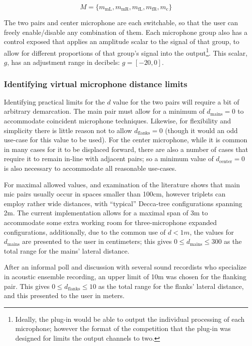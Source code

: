 \begin{equation}
M = \{m_\text{mL}, m_\text{mR}, m_\text{fL}, m_\text{fR}, m_\text{c}\}
\end{equation}

The two pairs and center microphone are each switchable, so that the user can freely enable/disable any combination of them. Each microphone group also has a control exposed that applies an amplitude scalar to the signal of that group, to allow for different proportions of that group's signal into the output\footnote{Ideally, the plug-in would be able to output the individual processing of each microphone; however the format of the competition that the plug-in was designed for limits the output channels to two.}. This scalar, $g$, has an adjustment range in decibels: $g = [-20,0]$.

\subsubsection{Identifying virtual microphone distance limits}

Identifying practical limits for the $d$ value for the two pairs will require a bit of arbitrary demarcation. The main pair must allow for a minimum of $d_\text{mains}=0$ to accommodate coincident microphone techniques. Likewise, for flexibility and simplicity there is little reason not to allow $d_\text{flanks} = 0$ (though it would an odd use-case for this value to be used). For the center microphone, while it is common in many cases for it to be displaced forward, there are also a number of cases that require it to remain in-line with adjacent pairs; so a minimum value of $d_\text{center} = 0$ is also necessary to accommodate all reasonable use-cases.

For maximal allowed values, and examination of the literature shows that main mic pairs usually occur in spaces smaller than 100cm, however triplets can employ rather wide distances, with ``typical'' Decca-tree configurations spanning 2m. The current implementation allows for a maximal span of 3m to accommodate some extra working room for three-microphone expanded configurations, additionally, due to the common use of $d < 1m$, the values for $d_\text{mains}$ are presented to the user in centimeters; this gives $0 \leq d_\text{mains} \leq 300$ as the total range for the mains' lateral distance.

After an informal poll and discussion with several sound recordists who specialize in acoustic ensemble recording, an upper limit of 10m was chosen for the flanking pair. This gives $0 \leq d_\text{flanks} \leq 10$ as the total range for the flanks' lateral distance, and this presented to the user in meters.

